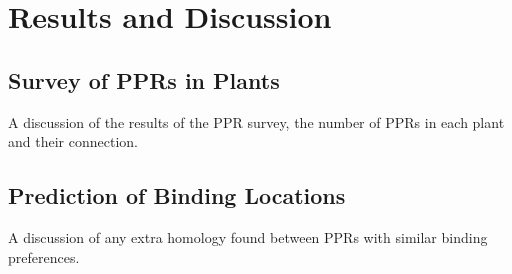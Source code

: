 
\chapter{Results and Discussion} 
\label{chap:results}

\section{Survey of PPRs in Plants}
\label{sec:ppr_survey}

A discussion of the results of the PPR survey, the number of PPRs in each plant
and their connection.

\section{Prediction of Binding Locations}

A discussion of any extra homology found between PPRs with similar binding
preferences.


